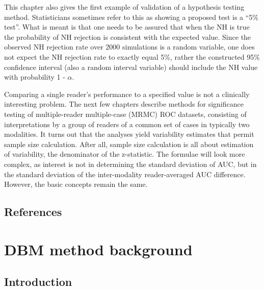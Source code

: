 \documentclass[
]{book}
\begin{document}
This chapter also gives the first example of validation of a hypothesis testing method. Statisticians sometimes refer to this as showing a proposed test is a ``5\% test''. What is meant is that one needs to be assured that when the NH is true the probability of NH rejection is consistent with the expected value. Since the observed NH rejection rate over 2000 simulations is a random variable, one does not expect the NH rejection rate to exactly equal 5\%, rather the constructed 95\% confidence interval (also a random interval variable) should include the NH value with probability 1 - \(\alpha\).

Comparing a single reader's performance to a specified value is not a clinically interesting problem. The next few chapters describe methods for significance testing of multiple-reader multiple-case (MRMC) ROC datasets, consisting of interpretations by a group of readers of a common set of cases in typically two modalities. It turns out that the analyses yield variability estimates that permit sample size calculation. After all, sample size calculation is all about estimation of variability, the denominator of the z-statistic. The formulae will look more complex, as interest is not in determining the standard deviation of AUC, but in the standard deviation of the inter-modality reader-averaged AUC difference. However, the basic concepts remain the same.

\hypertarget{HypothesisTesting-references}{%
\section{References}\label{HypothesisTesting-references}}

\hypertarget{DBMAnalysisBkgrnd}{%
\chapter{DBM method background}\label{DBMAnalysisBkgrnd}}

\hypertarget{DBMAnalysisBkgrnd-introduction}{%
\section{Introduction}\label{DBMAnalysisBkgrnd-introduction}}
\end{document}
